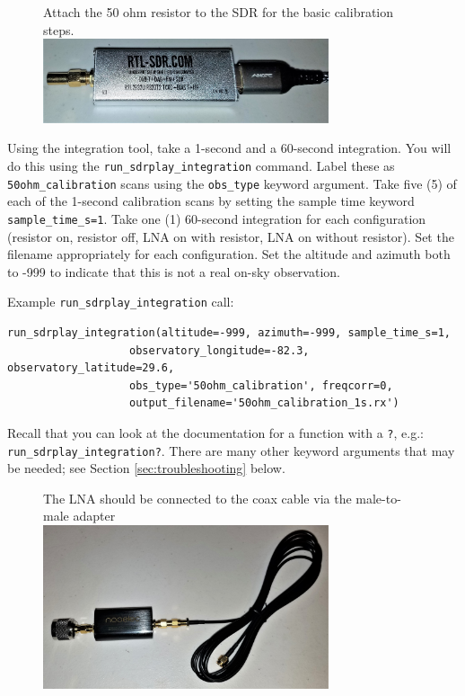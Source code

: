 \documentclass[11pt]{article}
\begin{document}
\begin{figure}[htp]
    \centering
    Attach the 50 ohm resistor to the SDR for the basic calibration steps. \\
\includegraphics[width=0.75\textwidth]{RadioLabPhotos/sdr_with_resistor.jpg}
\end{figure}

Using the integration tool, take a 1-second and a 60-second integration.
You will do this using the \verb|run_sdrplay_integration| command.
Label these as \verb|50ohm_calibration| scans using the \verb|obs_type| keyword argument.
Take five (5) of each of the 1-second calibration scans by setting the sample time keyword \verb|sample_time_s=1|.  Take one (1) 60-second integration
for each configuration (resistor on, resistor off, LNA on with resistor, LNA on without resistor).
Set the filename appropriately for each configuration.
Set the altitude and azimuth both to -999 to indicate that this
is not a real on-sky observation.


Example \verb|run_sdrplay_integration| call:\\
\begin{verbatim}
run_sdrplay_integration(altitude=-999, azimuth=-999, sample_time_s=1,
                   observatory_longitude=-82.3, observatory_latitude=29.6,
                   obs_type='50ohm_calibration', freqcorr=0,
                   output_filename='50ohm_calibration_1s.rx')
\end{verbatim}

Recall that you can look at the documentation for a function with a \verb|?|, e.g.:
\verb|run_sdrplay_integration?|.  There are many other keyword arguments that may be needed;
see Section \ref{sec:troubleshooting} below.



\begin{figure}[htp]
    \centering
    The LNA should be connected to the coax cable via the male-to-male adapter\\
\includegraphics[width=0.75\textwidth]{RadioLabPhotos/coaxcable_to_LNA.jpg}
\end{figure}
\end{document}
